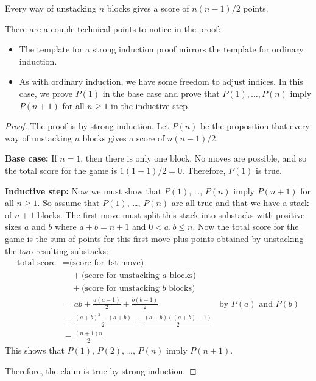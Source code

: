 \begin{theorem}\label{stacking}
Every way of unstacking $n$ blocks gives a score of $n(n-1)/2$ points.
\end{theorem}

There are a couple technical points to notice in the proof:

\begin{itemize}

\item The template for a strong induction proof mirrors the template
for ordinary induction.

\item As with ordinary induction, we have some freedom to adjust indices.
In this case, we prove $P(1)$ in the base case and prove that $P(1),
\dots, P(n)$ imply $P(n+1)$ for all $n \geq 1$ in the inductive step.

\end{itemize}

\begin{proof}
The proof is by strong induction.  Let $P(n)$ be the proposition that
every way of unstacking $n$ blocks gives a score of $n(n-1)/2$.

\textbf{Base case:} If $n = 1$, then there is only one
block.  No moves are possible, and so the total score for the game is
$1(1 - 1)/2 = 0$.  Therefore, $P(1)$ is true.

\textbf{Inductive step:} Now we must show that $P(1)$, \dots, $P(n)$ imply
$P(n+1)$ for all $n \geq 1$.  So assume that $P(1)$, \dots, $P(n)$ are all
true and that we have a stack of $n+1$ blocks.  The first move must split
this stack into substacks with positive sizes $a$ and $b$ where $a+b =
n+1$ and $0<a,b\leq n$.  Now the total score for the game is the sum of
points for this first move plus points obtained by unstacking the two
resulting substacks:
%
\begin{align*}
\text{total score}
    & = \text{(score for 1st move)} \\
    & \quad + \text{(score for unstacking $a$ blocks)} \\
    & \quad + \text{(score for unstacking $b$ blocks)} \\
    & = ab + \frac{a(a-1)}{2} + \frac{b(b-1)}{2} & \text{by $P(a)$ and $P(b)$}\\
    & = \frac{(a+b)^2-(a+b)}{2} = \frac{(a+b)((a+b)-1)}{2}\\
    & = \frac{(n+1)n}{2}
\end{align*}
%
This shows that $P(1)$, $P(2)$, \dots, $P(n)$ imply $P(n+1)$.

Therefore, the claim is true by strong induction.
\end{proof}

